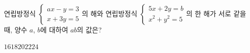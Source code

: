 연립방정식 $\begin{cases} ax-y=3 \\ x+3y=5 \end{cases}$의 해와 연립방정식 $\begin{cases} 5x+2y=b \\ x^2+y^2=5 \end{cases}$의 한 해가 서로 같을 때, 양수 $a$, $b$에 대하여 $ab$의 값은?
\begin{choices32}{$16$}{$18$}{$20$}{$22$}{$24$}\end{choices32}
